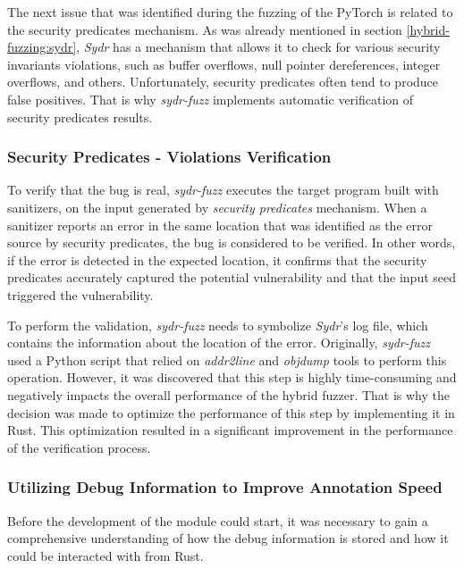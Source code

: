 The next issue that was identified during the fuzzing of the PyTorch is related to the security predicates mechanism. As was already mentioned in section \ref{hybrid-fuzzing:sydr}, \textit{Sydr} has a mechanism that allows it to check for various security invariants violations, such as buffer overflows, null pointer dereferences, integer overflows, and others. Unfortunately, security predicates often tend to produce false positives. That is why \textit{sydr-fuzz} implements automatic verification of security predicates results.

\subsubsection{Security Predicates - Violations Verification}

To verify that the bug is real, \textit{sydr-fuzz} executes the target program built with sanitizers, on the input generated by \textit{security predicates} mechanism. When a sanitizer reports an error in the same location that was identified as the error source by security predicates, the bug is considered to be verified. In other words, if the error is detected in the expected location, it confirms that the security predicates accurately captured the potential vulnerability and that the input seed triggered the vulnerability.

To perform the validation, \textit{sydr-fuzz} needs to symbolize \textit{Sydr}'s log file, which contains the information about the location of the error. Originally, \textit{sydr-fuzz} used a Python script that relied on \textit{addr2line} and \textit{objdump} tools to perform this operation. However, it was discovered that this step is highly time-consuming and negatively impacts the overall performance of the hybrid fuzzer. That is why the decision was made to optimize the performance of this step by implementing it in Rust. This optimization resulted in a significant improvement in the performance of the verification process.

\subsubsection{Utilizing Debug Information to Improve Annotation Speed}

Before the development of the module could start, it was necessary to gain a comprehensive understanding of how the debug information is stored and how it could be interacted with from Rust.


